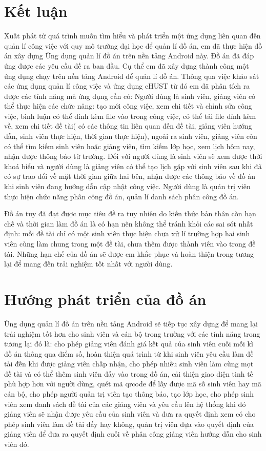 \documentclass[../Main.tex]{subfiles}
\begin{document}
\section{Kết luận}
Xuất phát từ quá trình muốn tìm hiểu và phát triển một ứng dụng liên quan đến quản lí công việc với quy mô trường đại học để quản lí đồ án, em đã thực hiện đồ án xây dựng Ứng dụng quản lí đồ án trên nền tảng Android này. 
Đồ án đã đáp ứng được các yêu cầu đề ra ban đầu. Cụ thể em đã xây dựng thành công một ứng dụng chạy trên nền tảng Android để quản lí đồ án. Thông qua việc khảo sát các ứng dụng quản lí công việc và ứng dụng eHUST từ đó em đã phân tích ra được các tính năng mà ứng dụng cần có: Người dùng là sinh viên, giảng viên có thể thực hiện các chức năng: tạo mới công việc, xem chi tiết và chỉnh sửa công việc, bình luận có thể đính kèm file vào trong công việc, có thể tải file đính kèm về, xem chi tiết đề tài( có các thông tin liên quan đến đề tài, giảng viên hướng dẫn, sinh viên thực hiện, thời gian thực hiện), ngoài ra sinh viên, giảng viên còn có thể tìm kiếm sinh viên hoặc giảng viên, tìm kiếm lớp học, xem lịch hôm nay, nhận được thông báo từ trường. Đối với người dùng là sinh viên sẽ xem được thời khoá biểu và người dùng là giảng viên có thể tạo lịch gặp với sinh viên sau khi đã có sự trao đổi về mặt thời gian giữa hai bên, nhận được các thông báo về đồ án khi sinh viên đang hướng dẫn cập nhật công việc. Người dùng là quản trị viên thực hiện chức năng phân công đồ án, quản lí danh sách phân công đồ án.

Đồ án tuy đã đạt được mục tiêu đề ra tuy nhiên do kiến thức bản thân còn hạn chế và thời gian làm đồ án là có hạn nên không thể tránh khỏi các sai sót nhất định: mỗi đề tài chỉ có một sinh viên thực hiện chưa xử lí trường hợp hai sinh viên cùng làm chung trong một đề tài, chưa thêm được thành viên vào trong đề tài. Những hạn chế của đồ án sẽ được em khắc phục và hoàn thiện trong tương lại để mang đến trải nghiệm tốt nhất với người dùng. 

\section{Hướng phát triển của đồ án}
Ứng dụng quản lí đồ án trên nền tảng Android sẽ tiếp tục xây dựng để mang lại trải nghiệm tốt hơn cho sinh viên và cán bộ trong trường với các tính năng trong tương lại đó là: cho phép giảng viên đánh giá kết quả của sinh viên cuối mỗi kì đồ án thông qua điểm số, hoàn thiện quá trình từ khi sinh viên yêu cầu làm đề tài đến khi được giảng viên chấp nhận, cho phép nhiều sinh viên làm cùng mọt đề tài và có thể thêm sinh viên đấy vào trong đồ án, cải thiện giao diện tinh tế phù hợp hơn với người dùng, quét mã qrcode để lấy được mã số sinh viên hay mã cán bộ, cho phép người quản trị viên tạo thông báo, tạo lớp học, cho phép sinh viên xem danh sách đề tài của các giảng viên và yêu cầu lên hệ thống khi đó giảng viên sẽ nhận được yêu cầu của sinh viên và đưa ra quyết định xem có cho phép sinh viên làm đề tài đấy hay không, quản trị viên dựa vào quyết định của giảng viên để đưa ra quyết định cuối về phân công giảng viên hướng dẫn cho sinh viên đó.   
\end{document}
